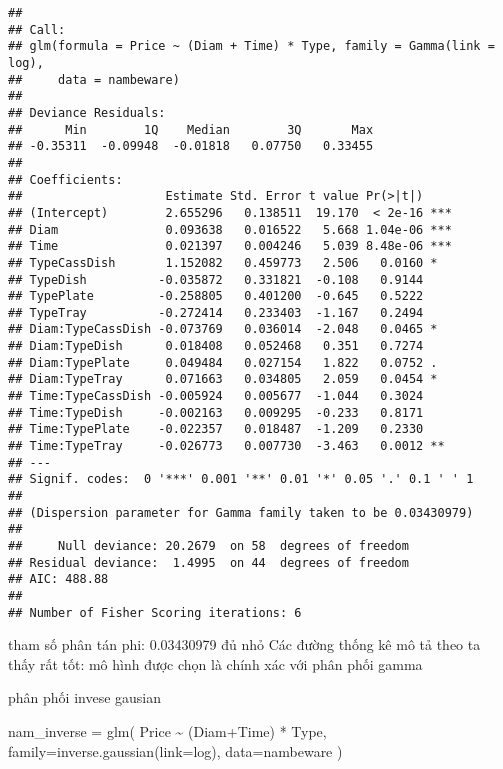 \documentclass[
]{article}
\newenvironment{Shaded}{\begin{snugshade}}{\end{snugshade}}
\newcommand{\AttributeTok}[1]{\textcolor[rgb]{0.77,0.63,0.00}{#1}}
\newcommand{\FunctionTok}[1]{\textcolor[rgb]{0.00,0.00,0.00}{#1}}
\newcommand{\NormalTok}[1]{#1}
\newcommand{\OtherTok}[1]{\textcolor[rgb]{0.56,0.35,0.01}{#1}}
\newcommand{\SpecialCharTok}[1]{\textcolor[rgb]{0.00,0.00,0.00}{#1}}
\begin{document}
\begin{verbatim}
## 
## Call:
## glm(formula = Price ~ (Diam + Time) * Type, family = Gamma(link = log), 
##     data = nambeware)
## 
## Deviance Residuals: 
##      Min        1Q    Median        3Q       Max  
## -0.35311  -0.09948  -0.01818   0.07750   0.33455  
## 
## Coefficients:
##                    Estimate Std. Error t value Pr(>|t|)    
## (Intercept)        2.655296   0.138511  19.170  < 2e-16 ***
## Diam               0.093638   0.016522   5.668 1.04e-06 ***
## Time               0.021397   0.004246   5.039 8.48e-06 ***
## TypeCassDish       1.152082   0.459773   2.506   0.0160 *  
## TypeDish          -0.035872   0.331821  -0.108   0.9144    
## TypePlate         -0.258805   0.401200  -0.645   0.5222    
## TypeTray          -0.272414   0.233403  -1.167   0.2494    
## Diam:TypeCassDish -0.073769   0.036014  -2.048   0.0465 *  
## Diam:TypeDish      0.018408   0.052468   0.351   0.7274    
## Diam:TypePlate     0.049484   0.027154   1.822   0.0752 .  
## Diam:TypeTray      0.071663   0.034805   2.059   0.0454 *  
## Time:TypeCassDish -0.005924   0.005677  -1.044   0.3024    
## Time:TypeDish     -0.002163   0.009295  -0.233   0.8171    
## Time:TypePlate    -0.022357   0.018487  -1.209   0.2330    
## Time:TypeTray     -0.026773   0.007730  -3.463   0.0012 ** 
## ---
## Signif. codes:  0 '***' 0.001 '**' 0.01 '*' 0.05 '.' 0.1 ' ' 1
## 
## (Dispersion parameter for Gamma family taken to be 0.03430979)
## 
##     Null deviance: 20.2679  on 58  degrees of freedom
## Residual deviance:  1.4995  on 44  degrees of freedom
## AIC: 488.88
## 
## Number of Fisher Scoring iterations: 6
\end{verbatim}

tham số phân tán phi: 0.03430979 đủ nhỏ Các đường thống kê mô tả theo ta
thấy rất tốt: mô hình được chọn là chính xác với phân phối gamma

phân phối invese gausian

\begin{Shaded}
\begin{Highlighting}[]
\NormalTok{nam\_inverse }\OtherTok{=} \FunctionTok{glm}\NormalTok{( Price }\SpecialCharTok{\textasciitilde{}}\NormalTok{ (Diam}\SpecialCharTok{+}\NormalTok{Time) }\SpecialCharTok{*}\NormalTok{ Type, }\AttributeTok{family=}\FunctionTok{inverse.gaussian}\NormalTok{(}\AttributeTok{link=}\NormalTok{log), }\AttributeTok{data=}\NormalTok{nambeware )}
\end{Highlighting}
\end{Shaded}
\end{document}
